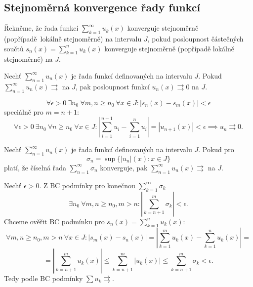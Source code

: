 \documentclass[12pt]{article}					%
\begin{document}
	\subsection{Stejnoměrná konvergence řady funkcí}
	\begin{definice}
		Řekněme, že řada funkcí $\sum_{k=1}^∞ u_k(x)$ konverguje stejnoměrně (popřípadě lokálně stejnoměrně) na intervalu $J$, pokud posloupnost částečných součtů $s_n(x) = \sum_{k=1}^n u_k(x)$ konverguje stejnoměrně (popřípadě lokálně stejnoměrně) na $J$.
	\end{definice}

	\begin{veta}
		Nechť $\sum_{n=1}^∞ u_n(x)$ je řada funkcí definovaných na intervalu $J$. Pokud $\sum_{n=1}^∞ u_n(x) \rightrightarrows$ na $J$, pak posloupnost funkcí $u_n(x) \rightrightarrows 0$ na $J$.

		\begin{dukazin}
			$$ \forall \epsilon > 0\ \exists n_0\ \forall m, n ≥ n_0\ \forall x \in J: |s_n(x) - s_m(x)| < \epsilon $$
			speciálně pro $m = n + 1$:
			$$ \forall \epsilon > 0\ \exists n_0\ \forall n ≥ n_0\ \forall x \in J: |\sum_{i=1}^{n+1} u_i - \sum_{i=1}^n u_i| = |u_{n+1}(x)| < \epsilon \implies u_n \rightrightarrows 0. $$
		\end{dukazin}
	\end{veta}

	\begin{veta}
		Nechť $\sum_{n=1}^∞ u_n(x)$ je řada funkcí definovaných na intervalu $J$. Pokud pro
		$$ \sigma_n = \sup\{|u_n|(x) : x \in J\} $$
		platí, že číselná řada $\sum_{n=1}^∞ \sigma_n$ konverguje, pak $\sum_{n=1}^∞ u_n(x) \rightrightarrows$ na $J$.

		\begin{dukazin}
%
%
			Nechť $\epsilon > 0$. Z BC podmínky pro konečnou $\sum_{k=1}^∞ \sigma_k$
			$$ \exists n_0\ \forall m, n ≥ n_0, m > n: |\sum_{k=n+1}^m \sigma_k| < \epsilon. $$
			Chceme ověřit BC podmínku pro $s_n(x) = \sum_{k=1}^n u_k(x)$:
			$$ \forall m, n ≥ n_0, m > n\ \forall x \in J: |s_m(x) - s_n(x)| = \left|\sum_{k=1}^m u_k(x) - \sum_{k=1}^n u_k(x)\right| = $$
			$$ = \left|\sum_{k=n+1}^m u_k(x)\right| ≤ \sum_{k=n+1}^m |u_k(x)| ≤ \sum_{k=n+1}^m \sigma_k < \epsilon. $$
			Tedy podle BC podmínky $\sum u_k \rightrightarrows$.
		\end{dukazin}
	\end{veta}
\end{document}

